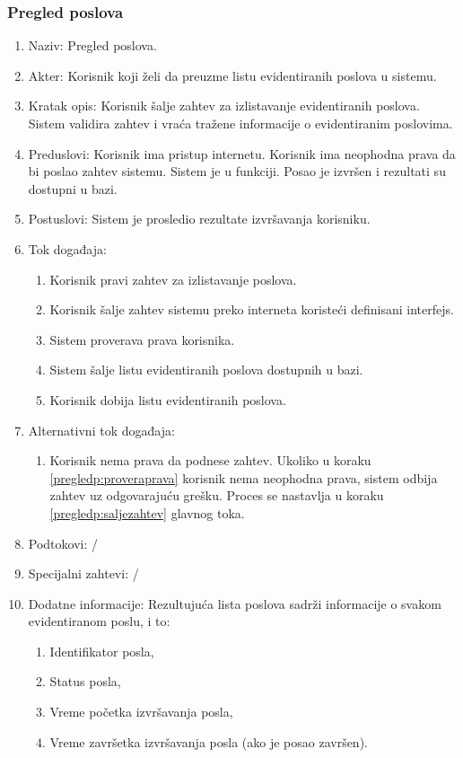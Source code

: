 \documentclass[12pt,oneside]{memoir}
\begin{document}
\subsubsection{Pregled poslova}
\begin{enumerate}
\item Naziv: Pregled poslova.
\item Akter: Korisnik koji želi da preuzme listu evidentiranih poslova u sistemu.
\item Kratak opis: Korisnik šalje zahtev za izlistavanje evidentiranih poslova. Sistem validira zahtev i vraća tražene informacije o evidentiranim poslovima.
\item Preduslovi: Korisnik ima pristup internetu. Korisnik ima neophodna prava da bi poslao zahtev sistemu. Sistem je u funkciji. Posao je izvršen i rezultati su dostupni u bazi.
\item Postuslovi: Sistem je prosledio rezultate izvršavanja korisniku.
\item Tok događaja:
	\begin{enumerate}
	\item \label{pregledp:konstruisezahtev} Korisnik pravi zahtev za izlistavanje poslova.
	\item \label{pregledp:saljezahtev} Korisnik šalje zahtev sistemu preko interneta koristeći definisani interfejs.
	\item \label{pregledp:proveraprava} Sistem proverava prava korisnika.
	\item \label{pregledp:slanjeliste} Sistem šalje listu evidentiranih poslova dostupnih u bazi.
	\item Korisnik dobija listu evidentiranih poslova.
	\end{enumerate}
\item Alternativni tok događaja:
	\begin{enumerate}
	\item Korisnik nema prava da podnese zahtev. Ukoliko u koraku \ref{pregledp:proveraprava} korisnik nema neophodna prava, sistem odbija zahtev uz odgovarajuću grešku. Proces se nastavlja u koraku \ref{pregledp:saljezahtev} glavnog toka.
	\end{enumerate}
\item Podtokovi: /
\item Specijalni zahtevi: /
\item Dodatne informacije: Rezultujuća lista poslova sadrži informacije o svakom evidentiranom poslu, i to:
	\begin{enumerate}
	\item Identifikator posla,
	\item Status posla,
	\item Vreme početka izvršavanja posla,
	\item Vreme završetka izvršavanja posla (ako je posao završen).
	\end{enumerate}
\end{enumerate}
\end{document}
